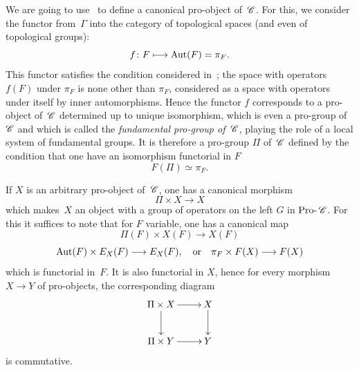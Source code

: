 We are going to use~ to define a canonical
pro-object of~$\cal{C}$. For this, we consider the functor
from~$\Gamma$ into the category of topological spaces
(and even of topological groups):
$$
f\colon F\mto \Aut(F)=\pi_F.
$$
This functor satisfies the condition considered in~;
the space with operators $f(F)$ under $\pi_F$ is none other than
$\pi_F$, considered as a space with operators under
itself by inner automorphisms. Hence the functor
$f$ corresponds to a pro-object of~$\cal{C}$ determined up to
unique isomorphism, which is even a pro-group of
$\cal{C}$ and which is called the \emph{fundamental pro-group
of~${\cal C}$},
playing the role of a local system of fundamental
groups. It is therefore a pro-group $\Pi$ of~$\cal{C}$ defined
by the condition that one have an isomorphism functorial in $F$
$$
F(\Pi)\simeq\pi_F.
$$

If $X$ is an arbitrary pro-object of~$\cal{C}$, one has a canonical
morphism
$$
\Pi\times X \to X
$$
which makes~$X$ an object with a group of operators on the left
$G$ in $\Prodash\cal{C}$. For this it suffices to note that for $F$
variable, one has a canonical map
$$
\Pi(F)\times X(F) \to X(F)
$$
\ie $$
\Aut(F)\times E_X(F) \to E_X(F), \quad \text{or} \quad \pi_F\times
F(X)\to F(X)
$$
which is functorial in~$F$. It is also functorial in $X$, hence
for every morphism $X\to Y$ of pro-objects, the corresponding
diagram
$$
\xymatrix{
\Pi \times X \ar[r]\ar[d]& X\ar[d] \\ \Pi \times Y \ar[r]& Y
}
$$
is commutative.


